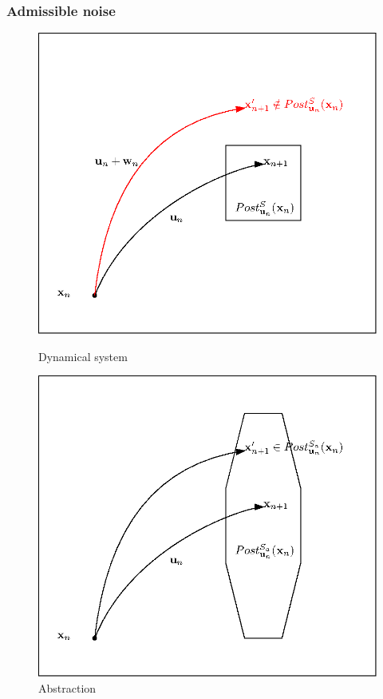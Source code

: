 \documentclass{beamer}
\begin{document}
\begin{frame}
\frametitle{Admissible noise}

\begin{figure}
\begin{minipage}{0.45\textwidth}
\centering
\includegraphics[width=\textwidth]{noise_1}
\caption{Dynamical system}
\end{minipage}
\pause
\begin{minipage}{0.45\textwidth}
\centering
\includegraphics[width=\textwidth]{noise_2}
\caption{Abstraction}
\end{minipage}
\end{figure}
\end{frame}	
\end{document}
